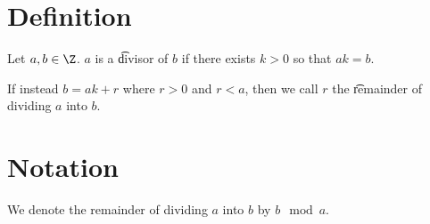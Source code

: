 
\section*{Definition}

Let $a, b \in \Z $.
$a$ is a \t{divisor} of $b$ if there exists $k > 0$ so that $ak = b$.

If instead $b = ak + r$ where $r > 0$ and $r < a$, then we call $r$ the \t{remainder} of dividing $a$ into $b$.

    \section*{Notation}


We denote the remainder of dividing $a$ into $b$ by $b \mod a$.

\blankpage

